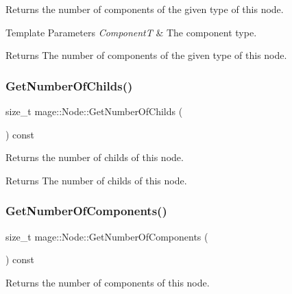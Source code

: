 Returns the number of components of the given type of this node.


\begin{DoxyTemplParams}{Template Parameters}
{\em ComponentT} & The component type. \\
\hline
\end{DoxyTemplParams}
\begin{DoxyReturn}{Returns}
The number of components of the given type of this node. 
\end{DoxyReturn}
\hypertarget{classmage_1_1_node_a975d92d3d93fe00d748c341198ddf02c}{}\label{classmage_1_1_node_a975d92d3d93fe00d748c341198ddf02c} 
\subsubsection{\texorpdfstring{Get\+Number\+Of\+Childs()}{GetNumberOfChilds()}}
{\footnotesize\ttfamily size\+\_\+t mage\+::\+Node\+::\+Get\+Number\+Of\+Childs (\begin{DoxyParamCaption}{ }\end{DoxyParamCaption}) const\hspace{0.3cm}{\ttfamily [noexcept]}}

Returns the number of childs of this node.

\begin{DoxyReturn}{Returns}
The number of childs of this node. 
\end{DoxyReturn}
\hypertarget{classmage_1_1_node_a51d74c74f31d8fcbc0cf6768fd180a8e}{}\label{classmage_1_1_node_a51d74c74f31d8fcbc0cf6768fd180a8e} 
\subsubsection{\texorpdfstring{Get\+Number\+Of\+Components()}{GetNumberOfComponents()}}
{\footnotesize\ttfamily size\+\_\+t mage\+::\+Node\+::\+Get\+Number\+Of\+Components (\begin{DoxyParamCaption}{ }\end{DoxyParamCaption}) const\hspace{0.3cm}{\ttfamily [noexcept]}}

Returns the number of components of this node.

